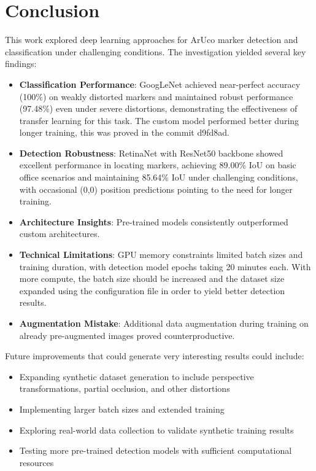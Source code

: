 \documentclass[conference]{IEEEtran}
\begin{document}
\section{Conclusion}

This work explored deep learning approaches for ArUco marker detection and classification under challenging conditions.
The investigation yielded several key findings:

\begin{itemize}
    \item \textbf{Classification Performance}: GoogLeNet achieved near-perfect accuracy (100\%) on weakly distorted markers
    and maintained robust performance (97.48\%) even under severe distortions, demonstrating the effectiveness of transfer learning for this task.
    The custom model performed better during longer training, this was proved in the commit d9fd8ad.
    
    \item \textbf{Detection Robustness}: RetinaNet with ResNet50 backbone showed excellent performance in locating markers,
    achieving 89.00\% IoU on basic office scenarios and maintaining 85.64\% IoU under challenging conditions,
    with occasional (0,0) position predictions pointing to the need for longer training.
    
    \item \textbf{Architecture Insights}: Pre-trained models consistently outperformed custom architectures.
    
    \item \textbf{Technical Limitations}: GPU memory constraints limited batch sizes and training duration, with detection model epochs
    taking 20 minutes each. With more compute, the batch size should be increased and the dataset size expanded using the configuration file
    in order to yield better detection results.

    \item \textbf{Augmentation Mistake}: Additional data augmentation during training on already pre-augmented images proved counterproductive.
\end{itemize}

Future improvements that could generate very interesting results could include:
\begin{itemize}
    \item Expanding synthetic dataset generation to include perspective transformations, partial occlusion, and other distortions
    \item Implementing larger batch sizes and extended training
    \item Exploring real-world data collection to validate synthetic training results
    \item Testing more pre-trained detection models with sufficient computational resources
\end{itemize}
\end{document}
